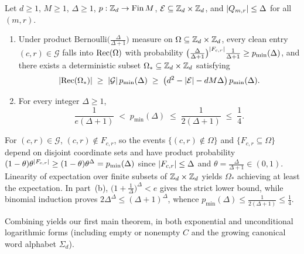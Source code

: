 \begin{lemma}\label{lem:first-moment}
Let $d \ge 1$, $M \ge 1$, $\Delta \ge 1$, $p : \mathbb{Z}_d \to \mathrm{Fin}\,M$,
$\mathcal{E} \subseteq \mathbb{Z}_d \times \mathbb{Z}_d$, and $\lvert Q_{m,r} \rvert \le \Delta$ for all $(m,r)$.
\begin{enumerate}[label=(\alph*)]
\item Under product $\mathrm{Bernoulli}\bigl(\frac{\Delta}{\Delta+1}\bigr)$ measure on
  $\Omega \subseteq \mathbb{Z}_d \times \mathbb{Z}_d$, every clean entry $(c,r) \in \mathcal{G}$ falls into
  $\operatorname{Rec}(\Omega)$ with probability
  $\bigl(\frac{\Delta}{\Delta+1}\bigr)^{\lvert F_{c,r} \rvert} \frac{1}{\Delta+1} \ge p_{\min}(\Delta)$,
  and there exists a deterministic subset $\Omega_* \subseteq \mathbb{Z}_d \times \mathbb{Z}_d$ satisfying
  \[
    \lvert \operatorname{Rec}(\Omega_*) \rvert \;\ge\; \lvert \mathcal{G} \rvert\,p_{\min}(\Delta)
    \;\ge\; \bigl(d^2 - \lvert \mathcal{E} \rvert - d M \Delta\bigr)\,p_{\min}(\Delta).
  \]
\item For every integer $\Delta \ge 1$,
  \[
    \frac{1}{e(\Delta+1)} \;<\; p_{\min}(\Delta) \;\le\; \frac{1}{2(\Delta+1)} \;\le\; \frac{1}{4}.
  \]
\end{enumerate}
\end{lemma}
\begin{outline}
For $(c,r) \in \mathcal{G}$, $(c,r) \notin F_{c,r}$, so the events $\{(c,r) \notin \Omega\}$ and
$\{F_{c,r} \subseteq \Omega\}$ depend on disjoint coordinate sets and have product probability
$(1 - \theta)\theta^{\lvert F_{c,r} \rvert} \ge (1 - \theta)\theta^\Delta = p_{\min}(\Delta)$ since
$\lvert F_{c,r} \rvert \le \Delta$ and $\theta = \frac{\Delta}{\Delta+1} \in (0,1)$. Linearity of
expectation over finite subsets of $\mathbb{Z}_d \times \mathbb{Z}_d$ yields $\Omega_*$ achieving at least the
expectation. In part~(b), $\bigl(1 + \frac{1}{\Delta}\bigr)^\Delta < e$ gives the strict lower
bound, while binomial induction proves $2\Delta^\Delta \le (\Delta+1)^\Delta$, whence
$p_{\min}(\Delta) \le \frac{1}{2(\Delta+1)} \le \frac{1}{4}$.
\end{outline}

Combining  yields our first main
theorem, in both exponential and unconditional logarithmic forms (including empty or nonempty $C$
and the growing canonical word alphabet $\Sigma_d$).

